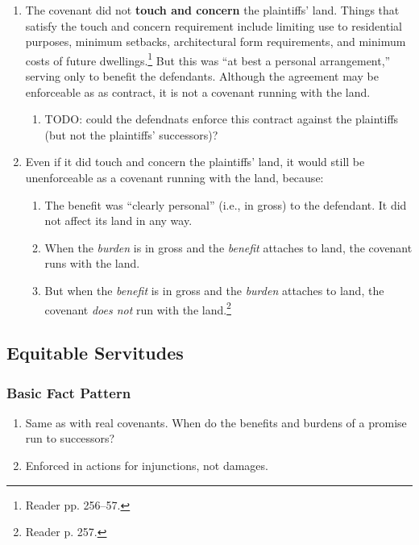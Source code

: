 \begin{enumerate}
\begin{enumerate}
        \item The covenant did not \textbf{touch and concern} the plaintiffs' 
        land. Things that satisfy the touch and concern requirement include 
        limiting use to residential purposes, minimum setbacks, architectural 
        form requirements, and minimum costs of future 
        dwellings.\footnote{Reader pp. 256--57.} But this was ``at best a 
        personal arrangement,'' serving only to benefit the defendants. 
        Although the agreement may be enforceable as as contract, it is not a 
        covenant running with the land.
        \begin{enumerate}
            \item  TODO: could the defendnats enforce this contract against 
            the plaintiffs (but not the plaintiffs' successors)?
        \end{enumerate}
        \item Even if it did touch and concern the plaintiffs' land, it would 
        still be unenforceable as a covenant running with the land, because:
        \begin{enumerate}
            \item The benefit was ``clearly personal'' (i.e., in gross) to the 
            defendant. It did not affect its land in any way.
            \item When the \emph{burden} is in gross and the \emph{benefit} 
            attaches to land, the covenant runs with the land.
            \item But when the \emph{benefit} is in gross and the 
            \emph{burden} attaches to land, the covenant \emph{does not} run 
            with the land.\footnote{Reader p. 257.}
        \end{enumerate}
    \end{enumerate}
\end{enumerate}

\subsection{Equitable Servitudes}

\subsubsection{Basic Fact Pattern}

\begin{enumerate}
    \item Same as with real covenants. When do the benefits and burdens of a 
    promise run to successors?
    \item Enforced in actions for injunctions, not damages.
\end{enumerate}

